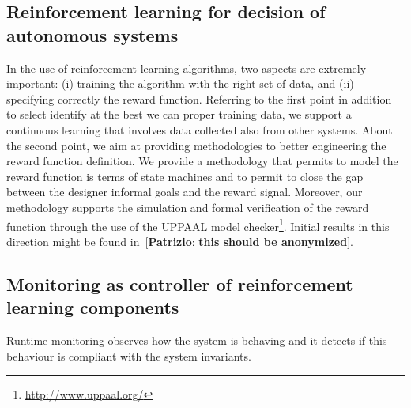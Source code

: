 \documentclass[sigconf,review, anonymous]{acmart}
\newcommand {\pat}[1]{[{\bf \underline{Patrizio}}: {\bf #1}]}
\begin{document}
\subsection{Reinforcement learning for decision of autonomous systems}

In the use of reinforcement learning algorithms, two aspects are extremely important: (i) training the algorithm with the right set of data, and  (ii) specifying correctly the reward function. Referring to the first point in addition to select identify at the best we can proper training data, we support a continuous learning that involves data collected also from other systems. About the second point, 
we aim at providing methodologies to better engineering the reward function definition. We provide a methodology that permits to model the reward function is terms of state machines and to permit to close the gap between the designer informal goals and the reward signal. Moreover, our methodology supports the simulation and formal verification of the reward function through the use of the UPPAAL model checker\footnote{\url{http://www.uppaal.org/}}. Initial results in this direction might be found in~\cite{IRC2018}\pat{this should be anonymized}.



\subsection{Monitoring as controller of reinforcement learning components}

Runtime monitoring observes how the system is behaving and it detects if this behaviour is compliant with the system invariants. 
\end{document}
